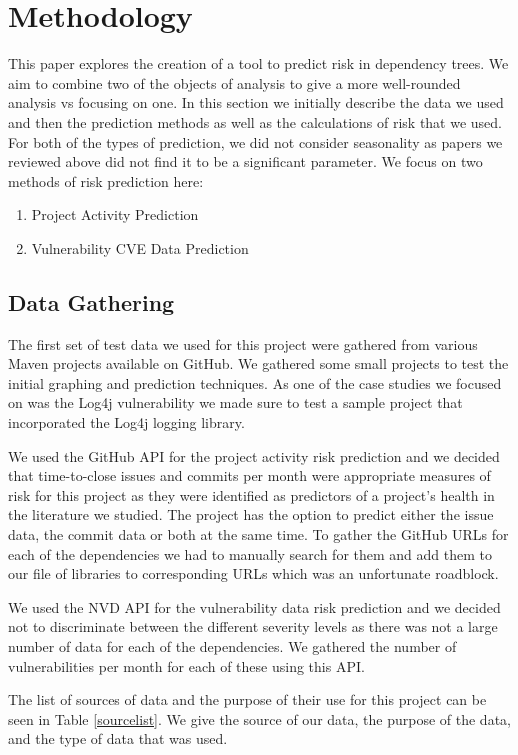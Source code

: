 \documentclass[conference]{IEEEtran}
\begin{document}
\section{Methodology}
This paper explores the creation of a tool to predict risk in dependency trees. We aim to combine two of the objects of analysis to give a more well-rounded analysis vs focusing on one. In this section we initially describe the data we used and then the prediction methods as well as the calculations of risk that we used. For both of the types of prediction, we did not consider seasonality as papers we reviewed above did not find it to be a significant parameter. We focus on two methods of risk prediction here: 
\begin{enumerate}
    \item Project Activity Prediction
    \item Vulnerability CVE Data Prediction
\end{enumerate}

\subsection{Data Gathering}
The first set of test data we used for this project were gathered from various Maven projects available on GitHub. We gathered some small projects to test the initial graphing and prediction techniques. As one of the case studies we focused on was the Log4j vulnerability we made sure to test a sample project that incorporated the Log4j logging library. 

We used the GitHub API for the project activity risk prediction and we decided that time-to-close issues and commits per month were appropriate measures of risk for this project as they were identified as predictors of a project's health in the literature we studied. The project has the option to predict either the issue data, the commit data or both at the same time. To gather the GitHub URLs for each of the dependencies we had to manually search for them and add them to our file of libraries to corresponding URLs which was an unfortunate roadblock. 

We used the NVD API for the vulnerability data risk prediction and we decided not to discriminate between the different severity levels as there was not a large number of data for each of the dependencies. We gathered the number of vulnerabilities per month for each of these using this API. 

The list of sources of data and the purpose of their use for this project can be seen in Table \ref{sourcelist}. We give the source of our data, the purpose of the data, and the type of data that was used. 
\end{document}
